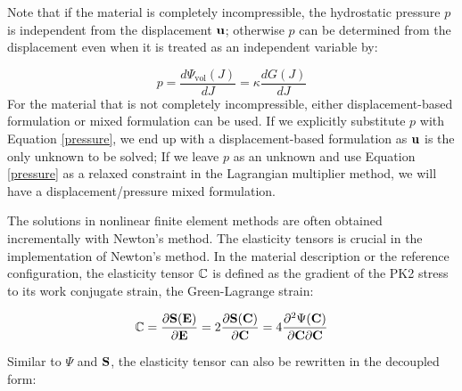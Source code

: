 Note that if the material is completely incompressible, the hydrostatic pressure $p$ is independent from the displacement $\bold{u}$; otherwise $p$ can be determined from the displacement even when it is treated as an independent variable by:

\begin{equation} \label{pressure}
p = \frac{d\Psi_\mathrm{vol}(J)}{dJ} = \kappa\frac{dG(J)}{dJ}
\end{equation}
For the material that is not completely incompressible, either displacement-based formulation or mixed formulation can be used. If we explicitly substitute $p$ with Equation \ref{pressure}, we end up with a displacement-based formulation as $\bold{u}$ is the only unknown to be solved; If we leave $p$ as an unknown and use Equation \ref{pressure} as a relaxed constraint in the Lagrangian multiplier method, we will have a displacement/pressure mixed formulation.

%
The solutions in nonlinear finite element methods are often obtained incrementally with Newton's method. The elasticity tensors is crucial in the implementation of Newton's method.
In the material description or the reference configuration, the elasticity tensor $\mathbb{C}$ is defined as the gradient of the PK2 stress to its work conjugate strain, the Green-Lagrange strain:

\begin{equation}
\mathbb{C} = \frac{\partial{\bold{S}(\bold{E})}}{\partial{\bold{E}}} =  2\frac{\partial{\bold{S}(\bold{C})}} {\partial{\bold{C}}} = 4 \frac{\partial^2{\Psi(\bold{C})}}{{\partial{\bold{C}}}{\partial{\bold{C}}}} \label{def_elasticity_tensor}
\end{equation}

Similar to $\Psi$ and $\bold{S}$, the elasticity tensor can also be rewritten in the decoupled form: 

